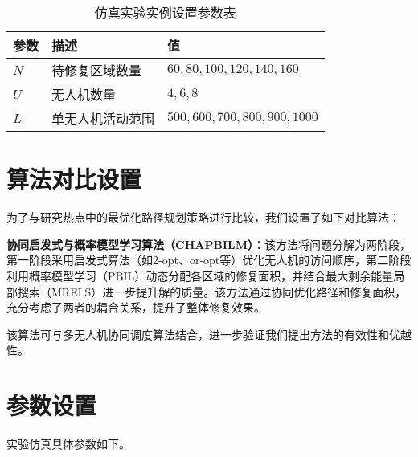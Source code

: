 \documentclass[AutoFakeBold]{LZUThesis}
\begin{document}
\begin{table}[H]
	\centering
	\caption{仿真实验实例设置参数表}
	\begin{tabular}{lll}
		\toprule
		参数  & 描述       & 值                               \\
		\midrule
		$N$ & 待修复区域数量  & $60, 80, 100, 120, 140, 160$    \\
		$U$ & 无人机数量    & $4, 6, 8$                       \\
		$L$ & 单无人机活动范围 & $500, 600, 700, 800, 900, 1000$ \\
		\bottomrule
	\end{tabular}
	\label{tbl_instance_setting}
\end{table}

\section{算法对比设置}

为了与研究热点中的最优化路径规划策略\cite{aggarwal2020path}进行比较，我们设置了如下对比算法：

\textbf{协同启发式与概率模型学习算法（CHAPBILM）\cite{JIAO2024108084}}：该方法将问题分解为两阶段，第一阶段采用启发式算法（如2-opt、or-opt等）优化无人机的访问顺序，第二阶段利用概率模型学习（PBIL）动态分配各区域的修复面积，并结合最大剩余能量局部搜索（MRELS）进一步提升解的质量。该方法通过协同优化路径和修复面积，充分考虑了两者的耦合关系，提升了整体修复效果。

该算法可与多无人机协同调度算法结合，进一步验证我们提出方法的有效性和优越性。
\section{参数设置}
实验仿真具体参数如下。
\end{document}
